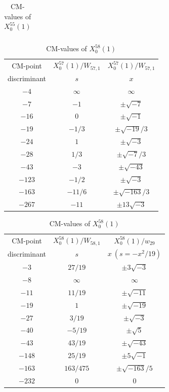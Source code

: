\documentclass{amsart}
\theoremstyle{definition}
\begin{document}
\begin{appendices}
\begin{table}
\begin{tabular}{|c|c|c|}
\end{tabular}
\bigskip
\caption{CM-values of $X^{55}_0(1)$}

\end{table}



\renewcommand{\arraystretch}{1.5}
\tabcolsep=10pt                         
\begin{table}
\renewcommand{\arraystretch}{1.5}
\tabcolsep=10pt                         
\begin{tabular}{|c|c|c|}
\hline
CM-point& ${X_{0}^{57}(1)/W_{57,1}}$ & ${X_{0}^{57}(1)/W_{57,1}}$  \\ 
         discriminant & $s$ & $x$\\ \hline
${-4}$ & $\infty$ & $\infty$  \\ 
${-7}$ & $-1$ & $\pm\sqrt{-7}$   \\ 
${-16}$ & $0$ & $\pm\sqrt{-1}$ \\ 
${-19}$ & $-{1}/{3}$ & $ \pm\sqrt{-19}/3$  \\
${-24}$ & $1$ & $\pm\sqrt{-3}$ \\ 
${-28}$ & ${1}/{3}$ & $\pm\sqrt{-7}/3$ \\
${-43}$ & $-3$ & $\pm\sqrt{-43}$  \\ 
${-123}$ & $-{1}/{2}$ & $ \pm\sqrt{
-3}$  \\ 
${-163}$ & $-{11}/{6}$ & $\pm\sqrt{-163}/3$  \\ 
${-267}$ & $-11$ & $\pm13\sqrt{-3}$ \\ \hline


\end{tabular}
\bigskip
\caption{CM-values of $X^{57}_0(1)$}


\begin{tabular}{|c|c|c|}
\hline
CM-point& ${X_{0}^{58}(1)/W_{58,1}}$ & ${X_{0}^{58}(1)/w_{29}}$  \\ 
        discriminant  & $s$ & $x\ (s={-x^2}/{19})$   \\ \hline

${-3}$ & ${27}/{19}$ & $\pm 3\sqrt{-3}$  \\ 
${-8}$ & $\infty$ & $\infty$  \\ 
${-11}$ & ${11}/{19}$ & $\pm \sqrt{-11}$   \\ 
${-19}$ & $1$ & $\pm \sqrt{-19}$    \\
${-27}$ & ${3}/{19}$ & $\pm \sqrt{-3}$   \\ 
${-40}$ & $-{5}/{19}$ & $\pm \sqrt{5}$   \\ 
${-43}$ & ${43}/{19}$ & $\pm \sqrt{-43}$ \\ 
${-148}$ & ${25}/{19}$ & $\pm 5\sqrt{-1}$  \\ 
${-163}$ & ${163}/{475}$ & $ \pm{\sqrt{-163}}/{5}$  \\ 
${-232}$ & $0$ & $ 0$ \\ \hline
\end{tabular}
\bigskip
\caption{CM-values of $X^{58}_0(1)$}


\end{table}
\end{appendices}
\end{document}

